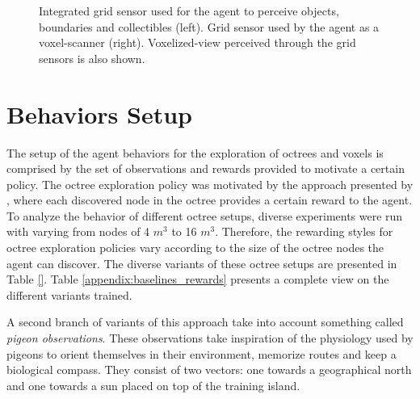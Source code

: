 \begin{figure}[!ht]
    \centering
    \caption{Integrated grid sensor used for the agent to perceive objects, boundaries and collectibles (left). Grid sensor used by the agent as a voxel-scanner (right). Voxelized-view perceived through the grid sensors is also shown.}
    \label{fig:unity-island-gridsensors}
\end{figure}

\section{Behaviors Setup}\label{chap:4:behaviors}

The setup of the agent behaviors for the exploration of octrees and voxels is comprised by the set of observations and rewards provided to motivate a certain policy. The octree exploration policy was motivated by the approach presented by \textcite{chen2019learning}, where each discovered node in the octree provides a certain reward to the agent. To analyze the behavior of different octree setups,  diverse experiments were run with varying from nodes of 4 $m^3$ to 16 $m^3$. Therefore, the rewarding styles for octree exploration policies vary according to the size of the octree nodes the agent can discover. The diverse variants of these octree setups are presented in Table \ref{}. Table \ref{appendix:baselines_rewards} presents a complete view on the different variants trained. 

A second branch of variants of this approach take into account something called \textit{pigeon observations}. These observations take inspiration of the physiology used by pigeons to orient themselves in their environment, memorize routes and keep a biological compass. They consist of two vectors: one towards a geographical north and one towards a sun placed on top of the training island. 

